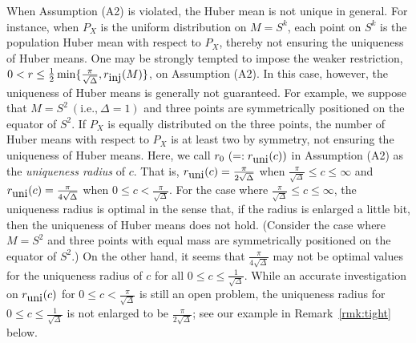 \documentclass[preprint]{imsart}
\theoremstyle{plain}
\theoremstyle{remark}
\begin{document}
\begin{appendix}
When Assumption (A2) is violated, the Huber mean is not unique in general. 
For instance, when $P_{X}$ is the uniform distribution on $M = S^{k}$, each point on $S^{k}$ is the population Huber mean with respect to $P_{X}$, thereby not ensuring the uniqueness of Huber means. 
One may be strongly tempted to impose the weaker restriction, $0 < r \le \frac{1}{2}\min\{\frac{\pi}{\sqrt{\Delta}}, r_{\mbox{\tiny inj}}(M)\}$, on Assumption (A2). In this case, however, the uniqueness of Huber means is generally not guaranteed. 
For example, we suppose that $M=S^{2} ~ (\mbox{i.e.,} ~ \Delta = 1)$ and three points are symmetrically positioned on the equator of $S^2$. If $P_{X}$ is equally distributed on the three points, the number of Huber means with respect to $P_{X}$ is at least two by symmetry, not ensuring the uniqueness of Huber means. Here, we call $r_0 ~ (=:r_{\mbox{\tiny uni}}(c))$ in Assumption (A2) as the \textit{uniqueness radius} of $c$. That is, $r_{\mbox{\tiny uni}}(c) = \frac{\pi}{2\sqrt{\Delta}}$ when $\frac{\pi}{\sqrt{\Delta}} \le c \le \infty$ and $r_{\mbox{\tiny uni}}(c) = \frac{\pi}{4\sqrt{\Delta}}$ when $0 \le c < \frac{\pi}{\sqrt{\Delta}}$. For the case where $\frac{\pi}{\sqrt{\Delta}} \le c \le \infty$, the uniqueness radius is optimal in the sense that, if the radius is enlarged a little bit, then the uniqueness of Huber means does not hold. (Consider the case where $M=S^{2}$ and three points with equal mass are symmetrically positioned on the equator of $S^2$.) On the other hand, it seems that $\frac{\pi}{4\sqrt{\Delta}}$ may not be optimal values for the uniqueness radius of $c$ for all $0 \le c \le \frac{1}{\sqrt{\Delta}}$. While an accurate investigation on $r_{\mbox{\tiny uni}}(c)$ for $0 \le c < \frac{\pi}{\sqrt{\Delta}}$ is still an open problem, the uniqueness radius for $0 \le c \le \frac{1}{\sqrt{\Delta}}$ is not enlarged to be $\frac{\pi}{2\sqrt{\Delta}}$; see our example in Remark~\ref{rmk:tight} below.




\end{appendix}
\end{document}
